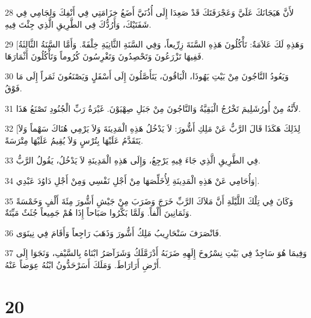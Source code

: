 \par 28 لأَنَّ هَيَجَانَكَ عَلَيَّ وَعَجْرَفَتَكَ قَدْ صَعِدَا إِلَى أُذُنَيَّ أَضَعُ خِزَامَتِي فِي أَنْفِكَ وَلِجَامِي فِي شَفَتَيْكَ، وَأَرُدُّكَ فِي الطَّرِيقِ الَّذِي جِئْتَ فِيهِ.
\par 29 [وَهَذِهِ لَكَ عَلاَمَةٌ: تَأْكُلُونَ هَذِهِ السَّنَةَ زِرِّيعاً، وَفِي السَّنَةِ الثَّانِيَةِ خِلْفَةً. وَأَمَّا السَّنَةُ الثَّالِثَةُ فَفِيهَا تَزْرَعُونَ وَتَحْصِدُونَ وَتَغْرِسُونَ كُرُوماً وَتَأْكُلُونَ أَثْمَارَهَا.
\par 30 وَيَعُودُ النَّاجُونَ مِنْ بَيْتِ يَهُوذَا، الْبَاقُونَ، يَتَأَصَّلُونَ إِلَى أَسْفَلٍ وَيَصْنَعُونَ ثَمَراً إِلَى مَا فَوْقُ.
\par 31 لأَنَّهُ مِنْ أُورُشَلِيمَ تَخْرُجُ الْبَقِيَّةُ وَالنَّاجُونَ مِنْ جَبَلِ صِهْيَوْنَ. غَيْرَةُ رَبِّ الْجُنُودِ تَصْنَعُ هَذَا.
\par 32 [لِذَلِكَ هَكَذَا قَالَ الرَّبُّ عَنْ مَلِكِ أَشُّورَ: لاَ يَدْخُلُ هَذِهِ الْمَدِينَةَ وَلاَ يَرْمِي هُنَاكَ سَهْماً وَلاَ يَتَقَدَّمُ عَلَيْهَا بِتُرْسٍ وَلاَ يُقِيمُ عَلَيْهَا مِتْرَسَةً.
\par 33 فِي الطَّرِيقِ الَّذِي جَاءَ فِيهِ يَرْجِعُ، وَإِلَى هَذِهِ الْمَدِينَةِ لاَ يَدْخُلُ، يَقُولُ الرَّبُّ.
\par 34 وَأُحَامِي عَنْ هَذِهِ الْمَدِينَةِ لِأُخَلِّصَهَا مِنْ أَجْلِ نَفْسِي وَمِنْ أَجْلِ دَاوُدَ عَبْدِي].
\par 35 وَكَانَ فِي تِلْكَ اللَّيْلَةِ أَنَّ مَلاَكَ الرَّبِّ خَرَجَ وَضَرَبَ مِنْ جَيْشِ أَشُّورَ مِئَةَ أَلْفٍ وَخَمْسَةً وَثَمَانِينَ أَلْفاً. وَلَمَّا بَكَّرُوا صَبَاحاً إِذَا هُمْ جَمِيعاً جُثَثٌ مَيِّتَةٌ.
\par 36 فَانْصَرَفَ سَنْحَارِيبُ مَلِكُ أَشُّورَ وَذَهَبَ رَاجِعاً وَأَقَامَ فِي نِينَوَى.
\par 37 وَفِيمَا هُوَ سَاجِدٌ فِي بَيْتِ نِسْرُوخَ إِلَهِهِ ضَرَبَهُ أَدْرَمَّلَكُ وَشَرَآصَرُ ابْنَاهُ بِالسَّيْفِ، وَنَجَوَا إِلَى أَرْضِ أَرَارَاطَ. وَمَلَكَ أَسَرْحَدُّونُ ابْنُهُ عِوَضاً عَنْهُ.

\chapter{20}

